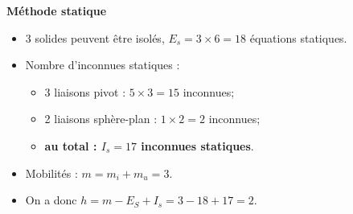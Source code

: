 \documentclass[10pt,fleqn]{article} %
\begin{document}
\begin{multicols}{2}
\textbf{Méthode statique}
\begin{itemize}
\item 3 solides peuvent être isolés, $E_s=3\times 6 =18$ équations statiques.
\item Nombre d'inconnues statiques : 
\begin{itemize}
\item 3 liaisons pivot : $5\times 3=15$ inconnues;
\item 2 liaisons sphère-plan : $1\times 2=2$ inconnues;
\item \textbf{au total : $I_s=17$ inconnues statiques}.
\end{itemize}
\item Mobilités : $m=m_i+m_u=3$.
\item On a donc $h=m-E_S+I_s =3-18+17=2$.
\end{itemize}
\end{multicols}
\end{document}
